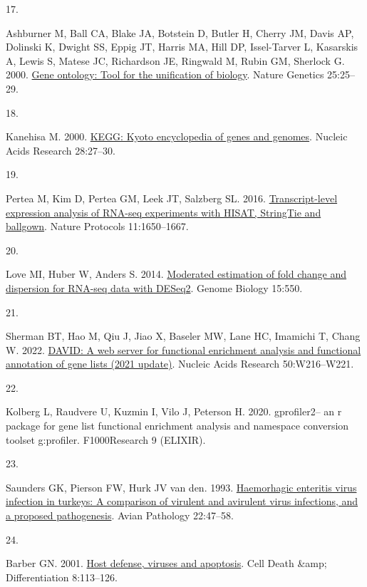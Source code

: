 \documentclass[
]{article}
\newlength{\cslhangindent}
\newlength{\csllabelwidth}
\newenvironment{CSLReferences}[2] %
 {\begin{list}{}{%
  \setlength{\itemindent}{0pt}
  \setlength{\leftmargin}{0pt}
  \setlength{\parsep}{0pt}
  \ifodd #1
   \setlength{\leftmargin}{\cslhangindent}
   \setlength{\itemindent}{-1\cslhangindent}
  \fi
  \setlength{\itemsep}{#2\baselineskip}}}
 {\end{list}}
\newcommand{\CSLLeftMargin}[1]{\parbox[t]{\csllabelwidth}{\strut#1\strut}}
\newcommand{\CSLRightInline}[1]{\parbox[t]{\linewidth - \csllabelwidth}{\strut#1\strut}}
\begin{document}
\begin{CSLReferences}{0}{1}
\CSLLeftMargin{17. }%
\CSLRightInline{Ashburner M, Ball CA, Blake JA, Botstein D, Butler H,
Cherry JM, Davis AP, Dolinski K, Dwight SS, Eppig JT, Harris MA, Hill
DP, Issel-Tarver L, Kasarskis A, Lewis S, Matese JC, Richardson JE,
Ringwald M, Rubin GM, Sherlock G. 2000.
\href{https://doi.org/10.1038/75556}{Gene ontology: Tool for the
unification of biology}. Nature Genetics 25:25--29.}

\CSLLeftMargin{18. }%
\CSLRightInline{Kanehisa M. 2000.
\href{https://doi.org/10.1093/nar/28.1.27}{KEGG: Kyoto encyclopedia of
genes and genomes}. Nucleic Acids Research 28:27--30.}

\CSLLeftMargin{19. }%
\CSLRightInline{Pertea M, Kim D, Pertea GM, Leek JT, Salzberg SL. 2016.
\href{https://doi.org/10.1038/nprot.2016.095}{Transcript-level
expression analysis of RNA-seq experiments with HISAT, StringTie and
ballgown}. Nature Protocols 11:1650--1667.}

\CSLLeftMargin{20. }%
\CSLRightInline{Love MI, Huber W, Anders S. 2014.
\href{https://doi.org/10.1186/s13059-014-0550-8}{Moderated estimation of
fold change and dispersion for RNA-seq data with DESeq2}. Genome Biology
15:550.}

\CSLLeftMargin{21. }%
\CSLRightInline{Sherman BT, Hao M, Qiu J, Jiao X, Baseler MW, Lane HC,
Imamichi T, Chang W. 2022.
\href{https://doi.org/10.1093/nar/gkac194}{DAVID: A web server for
functional enrichment analysis and functional annotation of gene lists
(2021 update)}. Nucleic Acids Research 50:W216--W221.}

\CSLLeftMargin{22. }%
\CSLRightInline{Kolberg L, Raudvere U, Kuzmin I, Vilo J, Peterson H.
2020. gprofiler2-- an r package for gene list functional enrichment
analysis and namespace conversion toolset g:profiler. F1000Research 9
(ELIXIR).}

\CSLLeftMargin{23. }%
\CSLRightInline{Saunders GK, Pierson FW, Hurk JV van den. 1993.
\href{https://doi.org/10.1080/03079459308418899}{Haemorhagic enteritis
virus infection in turkeys: A comparison of virulent and avirulent virus
infections, and a proposed pathogenesis}. Avian Pathology 22:47--58.}

\CSLLeftMargin{24. }%
\CSLRightInline{Barber GN. 2001.
\href{https://doi.org/10.1038/sj.cdd.4400823}{Host defense, viruses and
apoptosis}. Cell Death \&amp; Differentiation 8:113--126.}


\end{CSLReferences}
\end{document}
